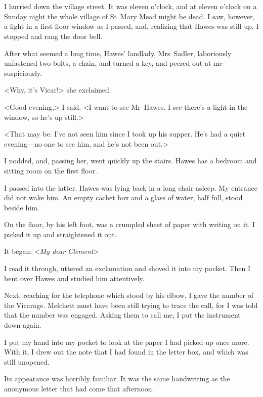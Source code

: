 \chapter[Chapter  \thechapter]{}


\lettrine{I}{} hurried down the village street. It was eleven o'clock, and at eleven o'clock on a Sunday night the whole village of St~Mary Mead might be dead. I saw, however, a light in a first floor window as I passed, and, realizing that Hawes was still up, I stopped and rang the door bell.

After what seemed a long time, Hawes' landlady, Mrs~Sadler, laboriously unfastened two bolts, a chain, and turned a key, and peered out at me suspiciously.

<Why, it's Vicar!> she exclaimed.

<Good evening,> I said. <I want to see Mr~Hawes. I see there's a light in the window, so he's up still.>

<That may be. I've not seen him since I took up his supper. He's had a quiet evening—no one to see him, and he's not been out.>

I nodded, and, passing her, went quickly up the stairs. Hawes has a bedroom and sitting room on the first floor.

I passed into the latter. Hawes was lying back in a long chair asleep. My entrance did not wake him. An empty cachet box and a glass of water, half full, stood beside him.

On the floor, by his left foot, was a crumpled sheet of paper with writing on it. I picked it up and straightened it out.

It began: <\textit{My dear Clement}\longdash>

I read it through, uttered an exclamation and shoved it into my pocket. Then I bent over Hawes and studied him attentively.

Next, reaching for the telephone which stood by his elbow, I gave the number of the Vicarage. Melchett must have been still trying to trace the call, for I was told that the number was engaged. Asking them to call me, I put the instrument down again.

I put my hand into my pocket to look at the paper I had picked up once more. With it, I drew out the note that I had found in the letter box, and which was still unopened.

Its appearance was horribly familiar. It was the same handwriting as the anonymous letter that had come that afternoon.

